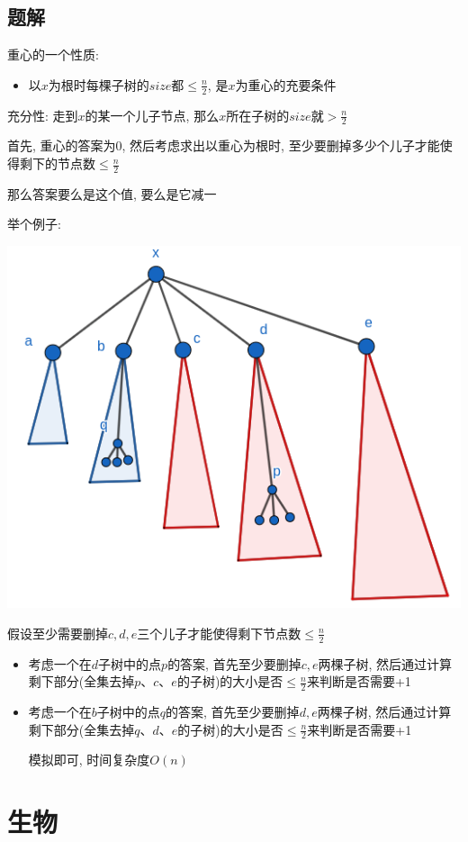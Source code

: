 \documentclass[12pt]{ctexart}
\begin{document}
\begin{spacing}{1.2}
	\subsection{题解}

	重心的一个性质: 

	\begin{itemize}
	\item 以$x$为根时每棵子树的$size$都$\le \frac{n}{2}$, 是$x$为重心的充要条件
	\end{itemize}

	充分性: 走到$x$的某一个儿子节点, 那么$x$所在子树的$size$就$ > \frac{n}{2}$

	首先, 重心的答案为$0$, 然后考虑求出以重心为根时, 至少要删掉多少个儿子才能使得剩下的节点数$\le \frac{n}{2}$

	那么答案要么是这个值, 要么是它减一

	举个例子: 

	\includegraphics[width=0.6\linewidth]{image/1.png}

	假设至少需要删掉$c, d, e$三个儿子才能使得剩下节点数$\le \frac{n}{2}$

	\begin{itemize}

	\item 考虑一个在$d$子树中的点$p$的答案, 首先至少要删掉$c, e$两棵子树, 然后通过计算剩下部分(全集去掉$p、c、e$的子树)的大小是否$\le \frac{n}{2}$来判断是否需要+1

	\item 考虑一个在$b$子树中的点$q$的答案, 首先至少要删掉$d, e$两棵子树, 然后通过计算剩下部分(全集去掉$q、d、e$的子树)的大小是否$\le \frac{n}{2}$来判断是否需要+1

	模拟即可, 时间复杂度$O(n)$

	\end{itemize}

	\newpage

	\section{生物}


\end{spacing}
\end{document}
